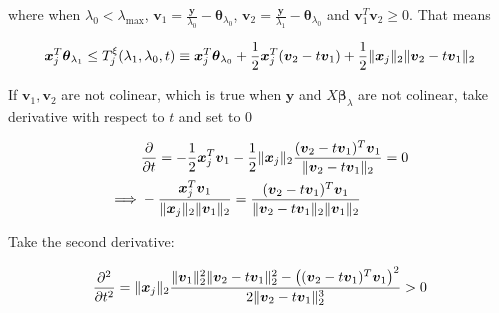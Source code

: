 where when $\lambda_0<\lambda_{\max}$, $\boldsymbol v_1=\frac{\boldsymbol y}{\lambda_0}-\boldsymbol\theta_{\lambda_0}$, $\boldsymbol v_2=\frac{\boldsymbol y}{\lambda_1}-\boldsymbol\theta_{\lambda_0}$ and $\boldsymbol v_1^T\boldsymbol v_2\geq0$. That means

\begin{gather}
    \label{eq:edppobj}
    \begin{aligned}
        \boldsymbol x_j^T\boldsymbol\theta_{\lambda_1}&\leq T^\xi_j(\lambda_1,\lambda_0,t)\equiv \boldsymbol x_j^T\boldsymbol\theta_{\lambda_0}+\frac{1}{2}\boldsymbol x_j^T(\boldsymbol v_2-t\boldsymbol v_1)+\frac{1}{2}\lVert\boldsymbol x_j\rVert_2\lVert\boldsymbol v_2-t\boldsymbol v_1\rVert_2\\
    \end{aligned}
\end{gather}

If $\boldsymbol v_1,\boldsymbol v_2$ are not colinear, which is true when $\boldsymbol y$ and $X\boldsymbol\beta_\lambda$ are not colinear, take derivative with respect to $t$ and set to 0

\begin{gather}
    \label{eq:edppdt}
    \begin{aligned}
        &\frac{\partial}{\partial t}=-\frac{1}{2}\boldsymbol x_j^T\boldsymbol v_1-\frac{1}{2}\lVert\boldsymbol x_j\rVert_2\frac{(\boldsymbol v_2-t\boldsymbol v_1)^T\boldsymbol v_1}{\lVert\boldsymbol v_2-t\boldsymbol v_1\rVert_2}=0\\
        \implies & -\frac{\boldsymbol x_j^T\boldsymbol v_1}{\lVert\boldsymbol x_j\rVert_2\lVert\boldsymbol v_1\rVert_2}=\frac{(\boldsymbol v_2-t\boldsymbol v_1)^T\boldsymbol v_1}{\lVert\boldsymbol v_2-t\boldsymbol v_1\rVert_2\lVert\boldsymbol v_1\rVert_2}\\
    \end{aligned}
\end{gather}

Take the second derivative:

\begin{equation}
    \frac{\partial^2}{\partial t^2}=\lVert\boldsymbol x_j\rVert_2\frac{\lVert\boldsymbol v_1\rVert^2_2\lVert\boldsymbol v_2-t\boldsymbol v_1\rVert^2_2-\left((\boldsymbol v_2-t\boldsymbol v_1)^T\boldsymbol v_1\right)^2}{2\lVert\boldsymbol v_2-t\boldsymbol v_1\rVert^3_2}>0
\end{equation}

